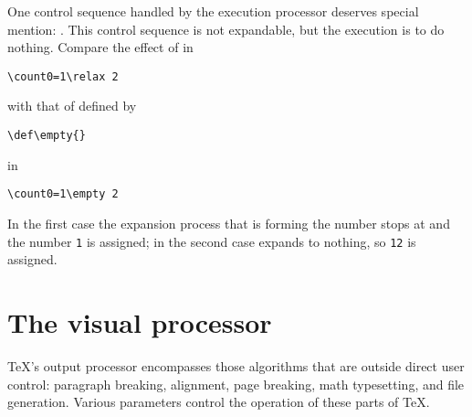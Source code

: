 \documentclass[letterpaper]{book}
\begin{document}
One control sequence handled by the execution processor 
deserves special mention: .
This control sequence is not expandable, but the execution
is to do nothing. Compare the effect of  in
\begin{verbatim}
\count0=1\relax 2
\end{verbatim}
with that of 
defined by
\begin{verbatim}
\def\empty{}
\end{verbatim}
in 
\begin{verbatim}
\count0=1\empty 2
\end{verbatim}
In the first case the expansion
process that is forming the number stops at  and
the number {\tt 1} is assigned; in the second case 
 expands to nothing, so {\tt 12} is assigned.

\section{The visual processor}

\TeX's output processor encompasses those algorithms that
are outside direct user control: paragraph breaking,
alignment, page breaking, math typesetting, and  file
generation. Various parameters control the operation
of these parts of \TeX.
\end{document}
